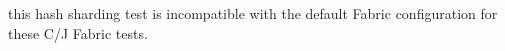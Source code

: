 
\begin{DoxyRefList}
\item[\label{todo__todo000001}%
\Hypertarget{todo__todo000001}%
Class \mbox{\hyperlink{classtestsuite_1_1fabric_1_1jdbc_1_1_test_hash_sharding}{testsuite.fabric.jdbc.Test\+Hash\+Sharding}} ]this hash sharding test is incompatible with the default Fabric configuration for these C/J Fabric tests. 
\end{DoxyRefList}